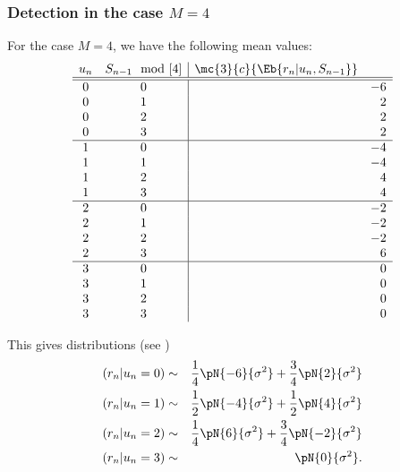 \subsubsection{Detection in the case $M=4$}
For the case $M=4$, we have the following mean values:
\[
\begin{array}{cc|rrr}
   u_n & S_{n-1}\mod[4] & \mc{3}{c}{\Eb{r_n|u_n,S_{n-1}}} \\
   \hline
   \hline
   0 & 0 && -6 \\
   0 & 1 &&  2 \\
   0 & 2 &&  2 \\
   0 & 3 &&  2 \\
\hline
   1 & 0 && -4 \\
   1 & 1 && -4 \\
   1 & 2 &&  4 \\
   1 & 3 &&  4 \\
\hline
   2 & 0 && -2 \\
   2 & 1 && -2 \\
   2 & 2 && -2 \\
   2 & 3 &&  6 \\
\hline
   3 & 0 &&  0 \\
   3 & 1 &&  0 \\
   3 & 2 &&  0 \\
   3 & 3 &&  0
\end{array}
\]

This gives distributions (see )
\begin{eqnarray*}
   (r_n|u_n=0) &\sim& \frac{1}{4}\pN{-6}{\sigma^2}+\frac{3}{4}\pN{2}{\sigma^2} \\
   (r_n|u_n=1) &\sim& \frac{1}{2}\pN{-4}{\sigma^2}+\frac{1}{2}\pN{4}{\sigma^2} \\
   (r_n|u_n=2) &\sim& \frac{1}{4}\pN{ 6}{\sigma^2}+\frac{3}{4}\pN{-2}{\sigma^2} \\
   (r_n|u_n=3) &\sim& \pN{ 0}{\sigma^2}.
\end{eqnarray*}


